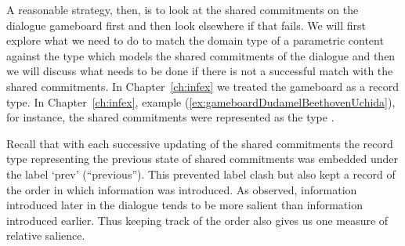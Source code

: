 A reasonable strategy, then, is to look at the shared
commitments on the dialogue gameboard first and then look elsewhere if
that fails.  We will first explore what we need to do to match the
domain type of a parametric content against the type which models the
shared commitments of the dialogue and then we will discuss what needs
to be done if there is not a successful match with the shared
commitments. In Chapter~\ref{ch:infex}  we treated the gameboard as a
record type.  In Chapter~\ref{ch:infex}, example 
(\ref{ex:gameboardDudamelBeethovenUchida}), for instance, the shared commitments
were represented as the type \nexteg{}.
\begin{ex} 
\end{ex} 
Recall that with each successive updating of the shared commitments
the record type representing the previous state of shared commitments
was embedded under the label `prev' (``previous'').  This prevented
label clash but also kept a record of the order in which information
was introduced.  As \cite{Lewis1979} observed, information introduced
later in the dialogue tends to be more salient than information
introduced earlier.  Thus keeping track of the order also gives us one
measure of relative salience.

